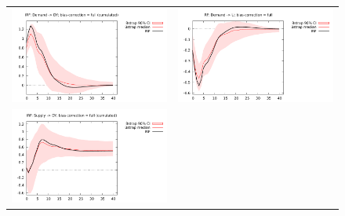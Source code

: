 \documentclass[a4paper,10pt]{article}
\newlength{\irfw}
\newlength{\irfh}
\begin{document}
\begin{figure}[htbp]
 \centering
  \begin{tabular}{cc}
    \includegraphics[width=\irfw, height=\irfh]{bq_Yd} &
    \includegraphics[width=\irfw, height=\irfh]{bq_ud} \\
    \includegraphics[width=\irfw, height=\irfh]{bq_Ys} &

\end{tabular}
\end{figure}
\end{document}
